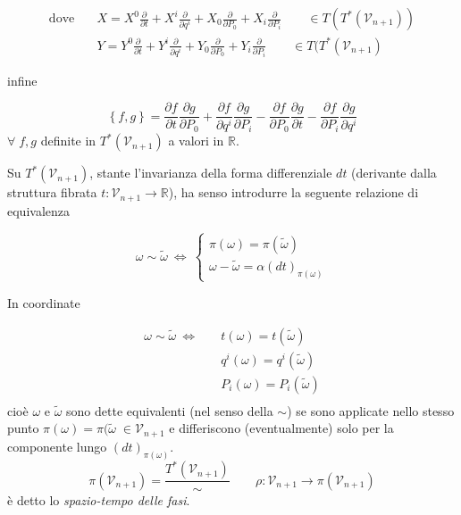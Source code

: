 \begin{equation*}
\begin{split}
\text{dove} \quad & X = X^0 \frac{\partial}{\partial t} + X^i \frac{\partial}{\partial q^i} + X_0 \frac{\partial}{\partial P_0} + X_i \frac{\partial}{\partial P_i}  \qquad \in T (T^* (\mathcal{V}_{n+1}))\\
& Y=Y^{0}\frac{\partial}{\partial t}+Y^{i}\frac{\partial}{\partial q^i}+Y_{0}\frac{\partial}{\partial P_{0}}+Y_{i}\frac{\partial}{\partial P_{i}}  \qquad \in T( T^* (\mathcal{V}_{n+1})
\end{split}
\end{equation*}

infine

\begin{center}
\begin{equation*}
\left\lbrace f, g \right\rbrace = \frac{\partial f}{\partial t} \frac{\partial g}{\partial P_0} +\frac{\partial f}{\partial q^i} \frac{\partial g}{\partial P_i} - \frac{\partial f}{\partial P_0} \frac{\partial g}{\partial t} -\frac{\partial f}{\partial P_i} \frac{\partial g}{\partial q^i}
\end{equation*}
$\forall \; f, g$ definite in $T^* (\mathcal{V}_{n+1})$ a valori in $\mathbb{R}$.
\end{center}


Su $T^* (\mathcal{V}_{n+1})$, stante l'invarianza della forma differenziale $ dt $ (derivante dalla struttura fibrata $ t : \mathcal{V}_{n+1} \rightarrow \mathbb{R} $), ha senso introdurre la seguente relazione di equivalenza

\begin{equation*}
\omega \sim \tilde{\omega} \
\Leftrightarrow \
\begin{cases}
\pi (\omega) = \pi(\tilde{\omega}) \\
\omega - \tilde{\omega}= \alpha(dt)_{\pi (\omega)}
\end{cases}
\end{equation*}

In coordinate

\begin{equation*}
\begin{split}
\omega \sim \tilde{\omega}\ \Leftrightarrow \quad & t (\omega)=t (\tilde{\omega}) \\
& q^i (\omega) = q^i (\tilde{\omega}) \\
& P_i (\omega) = P_i (\tilde{\omega}) \\
\end{split}
\end{equation*}
cioè $\omega$ e $\tilde{\omega}$ sono dette equivalenti (nel senso della $\sim$) se sono applicate nello stesso punto $\pi (\omega) = \pi(\tilde{\omega} \; \in \mathcal{V}_{n+1}$ e differiscono (eventualmente) solo per la componente lungo $(dt)_{\pi(\omega)}$.
\begin{equation*}
\pi (\mathcal{V}_{n+1}) = \frac{T^*(\mathcal{V}_{n+1})}{\sim} \qquad \rho: \mathcal{V}_{n+1} \rightarrow \pi (\mathcal{V}_{n+1}) 
\end{equation*}
è detto lo \textit{spazio-tempo delle fasi}. \\


